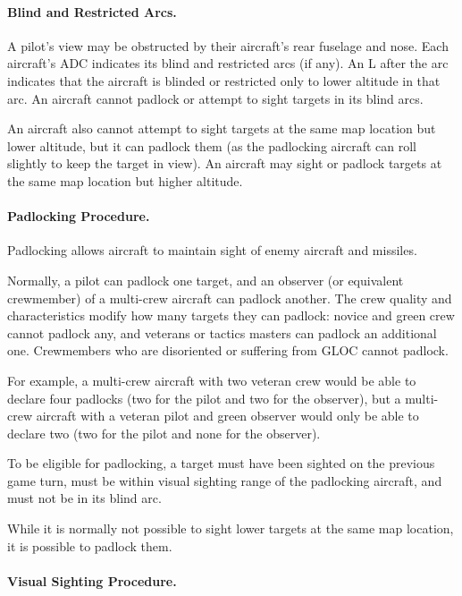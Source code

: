 {\paragraph{Blind and Restricted Arcs.} A pilot's view may be obstructed by their aircraft's rear fuselage and nose. Each aircraft's ADC indicates its blind and restricted arcs (if any). An L after the arc indicates that the aircraft is blinded or restricted only to lower altitude in that arc. An aircraft cannot padlock or attempt to sight targets in its blind arcs. 

An aircraft also cannot attempt to sight targets at the same map location but lower altitude, but it can padlock them (as the padlocking aircraft can roll slightly to keep the target in view). An aircraft may sight or padlock targets at the same map location but higher altitude.

\paragraph{Padlocking Procedure.}

Padlocking allows aircraft to maintain sight of enemy aircraft and missiles.

Normally, a pilot can padlock one target, and an observer (or equivalent crewmember) of a multi-crew aircraft can padlock another. The crew quality and characteristics modify how many targets they can padlock: novice and green crew cannot padlock any, and veterans or tactics masters can padlock an additional one. Crewmembers who are disoriented or suffering from GLOC cannot padlock.

For example, a multi-crew aircraft with two veteran crew would be able to declare four padlocks (two for the pilot and two for the observer), but a multi-crew aircraft with a veteran pilot and green observer would only be able to declare two (two for the pilot and none for the observer).

To be eligible for padlocking, a target must have been sighted on the previous game turn, must be within visual sighting range of the padlocking aircraft, and must not be in its blind arc. 

While it is normally not possible to sight lower targets at the same map location, it is possible to padlock them.

\paragraph{Visual Sighting Procedure.}

}

